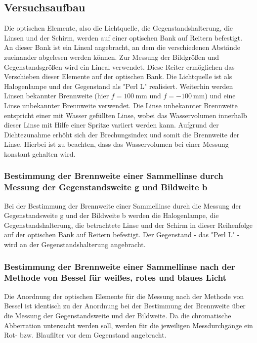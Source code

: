 \subsection{Versuchsaufbau}
\label{sec:Versuchsaufbau}

Die optischen Elemente, also die Lichtquelle, die Gegenstandshalterung, die Linsen und der
Schirm,
werden auf einer optischen Bank auf Reitern befestigt. An dieser Bank ist ein Lineal angebracht,
an dem die verschiedenen Abstände zueinander abgelesen werden können. 
Zur Messung der Bildgrößen und Gegenstandsgrößen wird ein Lineal verwendet.
Diese Reiter ermöglichen das Verschieben dieser Elemente auf der optischen Bank.
Die Lichtquelle ist als Halogenlampe und der Gegenstand als "Perl L" realisiert.
Weiterhin werden Linsen bekannter Brennweite (hier $f=\SI{100}{\milli\meter}$ und 
$f=-\SI{100}{\milli\meter}$) und eine Linse unbekannter Brennweite verwendet. Die Linse 
unbekannter Brennweite entspricht einer mit Wasser gefüllten Linse, wobei das Wasservolumen 
innerhalb dieser Linse mit Hilfe einer Spritze variiert werden kann. Aufgrund der 
Dichtezunahme erhöht sich der Brechungsindex und somit die Brennweite der Linse. 
Hierbei ist zu beachten, dass das Wasservolumen bei einer Messung konstant gehalten wird.

\subsubsection{Bestimmung der Brennweite einer Sammellinse durch Messung der Gegenstandsweite g und Bildweite b}
\label{sec:gundb}
Bei der Bestimmung der Brennweite einer Sammellinse durch die Messung der Gegenstandsweite g und 
der Bildweite b werden die Halogenlampe, die Gegenstandshalterung, die betrachtete 
Linse und der Schirm
in dieser Reihenfolge auf der optischen Bank auf Reitern befestigt.
Der Gegenstand - das "Perl L" - wird an der Gegenstandshalterung angebracht.

\subsubsection{Bestimmung der Brennweite einer Sammellinse nach der Methode von Bessel für 
weißes, rotes und blaues Licht}
\label{sec:bessel}
Die Anordnung der optischen Elemente für die Messung nach der Methode von Bessel ist identisch 
zu der Anordnung bei der Bestimmung der Brennweite über die Messung der Gegenstandsweite und der 
Bildweite.
Da die chromatische Abberration untersucht werden soll, werden für die jeweiligen 
Messdurchgänge ein Rot- bzw. Blaufilter vor dem Gegenstand angebracht.

